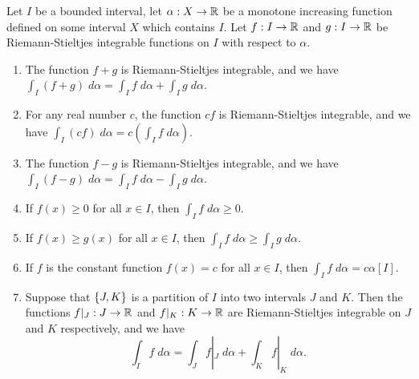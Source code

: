 \begin{ac}\label{i:ac:11.8.11}
  Let \(I\) be a bounded interval, let \(\alpha : X \to \mathbb{R}\) be a monotone increasing function defined on some interval \(X\) which contains \(I\).
  Let \(f : I \to \mathbb{R}\) and \(g : I \to \mathbb{R}\) be Riemann-Stieltjes integrable functions on \(I\) with respect to \(\alpha\).
  \begin{enumerate}
    \item\label{i:ac:11.8.11.a} The function \(f + g\) is Riemann-Stieltjes integrable, and we have \(\int_I (f + g) \; d \alpha = \int_I f \; d \alpha + \int_I g \; d \alpha\).
    \item\label{i:ac:11.8.11.b} For any real number \(c\), the function \(cf\) is Riemann-Stieltjes integrable, and we have \(\int_I (cf) \; d \alpha = c(\int_I f \; d \alpha)\).
    \item\label{i:ac:11.8.11.c} The function \(f - g\) is Riemann-Stieltjes integrable, and we have \(\int_I (f - g) \; d \alpha = \int_I f \; d \alpha - \int_I g \; d \alpha\).
    \item\label{i:ac:11.8.11.d} If \(f(x) \geq 0\) for all \(x \in I\), then \(\int_I f \; d \alpha \geq 0\).
    \item\label{i:ac:11.8.11.e} If \(f(x) \geq g(x)\) for all \(x \in I\), then \(\int_I f \; d \alpha \geq \int_I g \; d \alpha\).
    \item\label{i:ac:11.8.11.f} If \(f\) is the constant function \(f(x) = c\) for all \(x \in I\), then \(\int_I f \; d \alpha = c \alpha[I]\).
    \item\label{i:ac:11.8.11.g} Suppose that \(\left\lbrace J, K\right\rbrace\) is a partition of \(I\) into two intervals \(J\) and \(K\).
    Then the functions \(f|_J : J \to \mathbb{R}\) and \(f|_K : K \to \mathbb{R}\) are Riemann-Stieltjes integrable on \(J\) and \(K\) respectively, and we have
    \[
      \int_I f \; d \alpha = \int_J f|_J \; d \alpha + \int_K f|_K \; d \alpha.
    \]
  \end{enumerate}
\end{ac}


